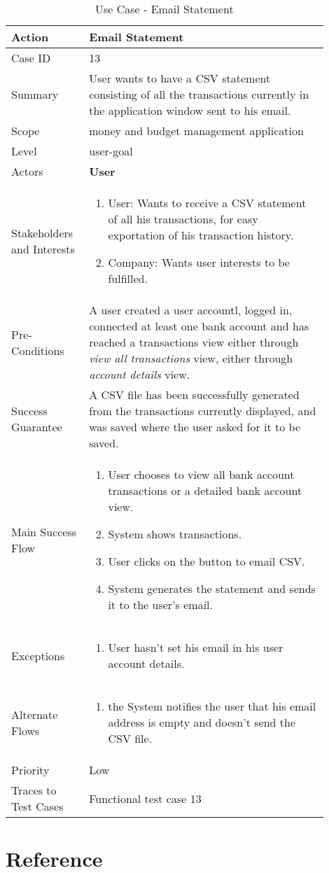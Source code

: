 \documentclass[11pt]{article}
\newcounter{use case ID}
\newcommand\tabularhead[1]{
    \begin{table}[ht]
        \addtocounter{use case ID}{1}
        \caption{Use Case \arabic{use case ID} - #1}
        \vspace{0.2cm}
        \begin{tabular}{|p{0.2\linewidth}|p{0.70\linewidth}|}
            \hline
            \textbf{Action} & \textbf{#1} \\
            \hline}
\newcommand\addrow[2]{#1 & #2\\ \hline}
\newcommand\addmulrow[2]{ \begin{minipage}[t][][t]{2.5cm}#1\end{minipage}
                &\begin{minipage}[t][][t]{11cm}
                    \begin{enumerate}[itemsep=-1ex] #2   \end{enumerate}
                \end{minipage}\vfill\\ \hline}
\newenvironment{usecase}{\tabularhead}
        {\hline\end{tabular}\end{table}}
\begin{document}
\begin{usecase}{Email Statement}
    \addrow{Case ID}{13}
    \addrow{Summary}{User wants to have a CSV statement consisting of all the transactions currently in the application window sent to his email.}
    \addrow{Scope}{money and budget management application}
    \addrow{Level}{user-goal}
    \addrow{Actors}{\textbf{User}}
    \addmulrow{Stakeholders and Interests}{
    \item User: Wants to receive a CSV statement of all his transactions, for easy exportation of his transaction history.
    \item Company: Wants user interests to be fulfilled.}
    \addrow{Pre-Conditions}{A user created a user accountl, logged in, connected at least one bank account and has reached a transactions view either through \textit{view all transactions} view, either through \textit{account details} view.}
    \addrow{Success Guarantee}{A CSV file has been successfully generated from the transactions currently displayed, and was saved where the user asked for it to be saved.}
    \addmulrow{Main Success Flow}{
      \item User chooses to view all bank account transactions or a detailed bank account view.
      \item System shows transactions.
      \item User clicks on the button to email CSV.
      \item System generates the statement and sends it to the user's email.
    }
    \addmulrow{Exceptions}{
    \item User hasn't set his email in his user account details.}
    \addmulrow{Alternate Flows}{
    \item the System notifies the user that his email address is empty and doesn't send the CSV file.
    }
    \addrow{Priority}{Low}
    \addrow{Traces to Test Cases}{Functional test case 13}
\end{usecase}

\clearpage
\section{Reference}
\end{document}
